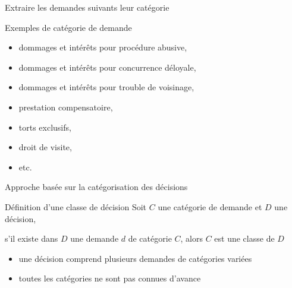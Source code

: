 \documentclass[newPxFont,pagenumber]{beamer}
\begin{document}
\begin{frame}{Extraire les demandes suivants leur catégorie}

\begin{block}{Exemples de catégorie de demande}

\begin{itemize}
\item dommages et intérêts pour procédure abusive,
\item dommages et intérêts pour concurrence déloyale,
\item dommages et intérêts pour trouble de voisinage, 
\item prestation compensatoire,
\item torts exclusifs,
\item droit de visite,
\item etc.

\end{itemize}
\end{block}

\end{frame}

\begin{frame}{Approche basée sur la catégorisation des décisions}

\begin{block}{Définition d'une classe de décision}
Soit $C$ une catégorie de demande et $D$ une décision,

s'il existe dans $D$ une demande $d$ de catégorie $C$, alors $C$ est une classe de $D$
\end{block}

\begin{alertblock}{}
\begin{itemize}
\item une décision comprend plusieurs demandes de catégories variées
\item toutes les catégories ne sont pas connues d'avance
\end{itemize}
\end{alertblock}
\end{frame}
\end{document}
